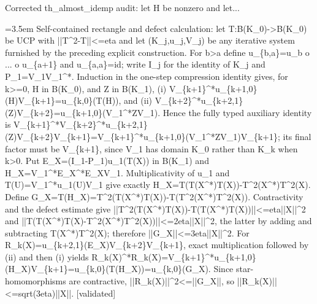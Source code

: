 \documentclass{article}
\newcommand{\step}[1]{\par\noindent\hangindent=3.5em\hangafter=1%
  \makebox[3.5em][l]{\textbf{#1.}}}
\newcommand{\steptag}[1]{\hfill{\small\textsf{[#1]}}}
\begin{document}
\begin{proofbox}{Corrected th\_almost\_idemp audit: let H be nonzero and let...}
\step{1.2.2.2} Self-contained rectangle and defect calculation: let T:B(K\_0)->B(K\_0) be UCP with ||T\textasciicircum{}2-T||<=eta and let (K\_j,u\_j,V\_j) be any iterative system furnished by the preceding explicit construction. For b>a define u\_\{b,a\}=u\_b o ... o u\_\{a+1\} and u\_\{a,a\}=id; write I\_j for the identity of K\_j and P\_1=V\_1V\_1\textasciicircum{}*. Induction in the one-step compression identity gives, for k>=0, H in B(K\_0), and Z in B(K\_1), (i) V\_\{k+1\}\textasciicircum{}*u\_\{k+1,0\}(H)V\_\{k+1\}=u\_\{k,0\}(T(H)), and (ii) V\_\{k+2\}\textasciicircum{}*u\_\{k+2,1\}(Z)V\_\{k+2\}=u\_\{k+1,0\}(V\_1\textasciicircum{}*ZV\_1). Hence the fully typed auxiliary identity is V\_\{k+1\}\textasciicircum{}*V\_\{k+2\}\textasciicircum{}*u\_\{k+2,1\}(Z)V\_\{k+2\}V\_\{k+1\}=V\_\{k+1\}\textasciicircum{}*u\_\{k+1,0\}(V\_1\textasciicircum{}*ZV\_1)V\_\{k+1\}; its final factor must be V\_\{k+1\}, since V\_1 has domain K\_0 rather than K\_k when k>0. Put E\_X=(I\_1-P\_1)u\_1(T(X)) in B(K\_1) and H\_X=V\_1\textasciicircum{}*E\_X\textasciicircum{}*E\_XV\_1. Multiplicativity of u\_1 and T(U)=V\_1\textasciicircum{}*u\_1(U)V\_1 give exactly H\_X=T(T(X\textasciicircum{}*)T(X))-T\textasciicircum{}2(X\textasciicircum{}*)T\textasciicircum{}2(X). Define G\_X=T(H\_X)=T\textasciicircum{}2(T(X\textasciicircum{}*)T(X))-T(T\textasciicircum{}2(X\textasciicircum{}*)T\textasciicircum{}2(X)). Contractivity and the defect estimate give ||T\textasciicircum{}2(T(X\textasciicircum{}*)T(X))-T(T(X\textasciicircum{}*)T(X))||<=eta||X||\textasciicircum{}2 and ||T(T(X\textasciicircum{}*)T(X)-T\textasciicircum{}2(X\textasciicircum{}*)T\textasciicircum{}2(X))||<=2eta||X||\textasciicircum{}2, the latter by adding and subtracting T(X\textasciicircum{}*)T\textasciicircum{}2(X); therefore ||G\_X||<=3eta||X||\textasciicircum{}2. For R\_k(X)=u\_\{k+2,1\}(E\_X)V\_\{k+2\}V\_\{k+1\}, exact multiplication followed by (ii) and then (i) yields R\_k(X)\textasciicircum{}*R\_k(X)=V\_\{k+1\}\textasciicircum{}*u\_\{k+1,0\}(H\_X)V\_\{k+1\}=u\_\{k,0\}(T(H\_X))=u\_\{k,0\}(G\_X). Since star-homomorphisms are contractive, ||R\_k(X)||\textasciicircum{}2<=||G\_X||, so ||R\_k(X)||<=sqrt(3eta)||X||. \steptag{validated} \\[4pt]

\end{proofbox}
\end{document}
